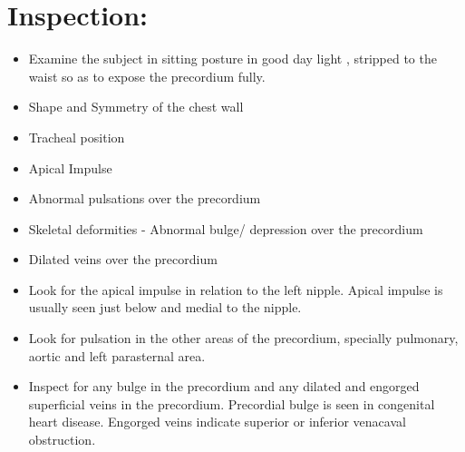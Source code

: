 \documentclass[a4paper,12pt,openany,twoside]{book}
\begin{document}
\section*{Inspection:}
\par
\begin{itemize}
\item{Examine the subject in sitting posture in good day light , stripped to the waist so as to expose the precordium fully.}
\item{Shape and Symmetry of the chest wall}
\item{Tracheal position}
\item{Apical Impulse}
\item{Abnormal pulsations over the precordium}
\item{Skeletal deformities - Abnormal bulge/ depression over the precordium}
\item{Dilated veins over the precordium}
\item{	Look for the apical impulse in relation to the left nipple. Apical impulse is usually seen just below and medial to the nipple.}
\item{	Look for pulsation in the other areas of the precordium, specially pulmonary, aortic and left parasternal area.}
\item{	Inspect for any bulge in the precordium and any dilated and engorged superficial veins in the precordium. Precordial bulge is seen in congenital heart disease. Engorged veins indicate superior or inferior venacaval obstruction.}
\end{itemize}
\end{document}
